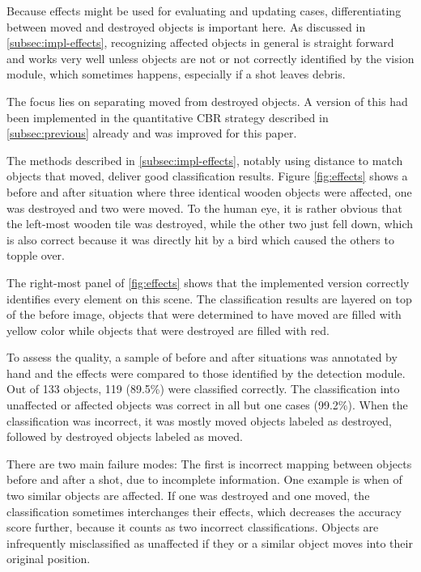 Because effects might be used for evaluating and updating cases, differentiating between moved and destroyed objects is important here.
As discussed in \ref{subsec:impl-effects}, recognizing affected objects in general is straight forward and works very well unless objects are not or not correctly identified by the vision module, which sometimes happens, especially if a shot leaves debris.

The focus lies on separating moved from destroyed objects.
A version of this had been implemented in the quantitative \ac{CBR} strategy described in \ref{subsec:previous} already and was improved for this paper.

The methods described in \ref{subsec:impl-effects}, notably using distance to match objects that moved, deliver good classification results. Figure \ref{fig:effects} shows a before and after situation where three identical wooden objects were affected, one was destroyed and two were moved.
To the human eye, it is rather obvious that the left-most wooden tile was destroyed, while the other two just fell down, which is also correct because it was directly hit by a bird which caused the others to topple over.

The right-most panel of \ref{fig:effects} shows that the implemented version correctly identifies every element on this scene.
The classification results are layered on top of the before image, objects that were determined to have moved are filled with yellow color while objects that were destroyed are filled with red.

To assess the quality, a sample of before and after situations was annotated by hand and the effects were compared to those identified by the detection module. Out of 133 objects, 119 (89.5\%) were classified correctly. The classification into unaffected or affected objects was correct in all but one cases (99.2\%).
When the classification was incorrect, it was mostly moved objects labeled as destroyed, followed by destroyed objects labeled as moved.

There are two main failure modes: The first is incorrect mapping between objects before and after a shot, due to incomplete information. One example is when of two similar objects are affected. If one was destroyed and one moved, the classification sometimes interchanges their effects, which decreases the accuracy score further, because it counts as two incorrect classifications.
Objects are infrequently misclassified as unaffected if they or a similar object moves into their original position.


